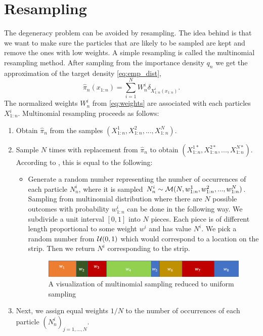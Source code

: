 \documentclass[10pt]{article}
\theoremstyle{definition}
\numberwithin{equation}{section}
\begin{document}
\section{Resampling}
The degeneracy problem can be avoided by resampling. The idea behind is that we want to make sure the particles that are likely to be sampled are kept and remove the ones with low weights. A simple resampling is called the multinomial resampling method. After sampling from the importance density $q_n$ we get the approximation of the target density \eqref{eq:emp_dist}, $$\hat{\pi}_n(x_{1:n}) = \sum_{i=1}^{N} W^i_n \delta_{X^i_{1:n}(x_{1:n})}.$$ The normalized weights $W_n^i$ from \eqref{eq:weights} are associated with each particles $X^i_{1:n}$. Multinomial resampling \cite{gordon1993novel} proceeds as follows:
\begin{enumerate}
	\item Obtain $\hat{\pi}_n$ from the samples $(X^1_{1:n}, X^2_{1:n}, ..., X^N_{1:n} )$.
	\item Sample $N$ times with replacement from $\hat{\pi}_n$ to obtain $(X^{1*}_{1:n}, X^{2*}_{1:n}, ..., X^{N*}_{1:n} ).$ According to \cite{doucet2008}, this is equal to the following:
	\begin{itemize}	
		\item Generate a random number representing the number of occurrences of each particle $N^i_n$, where it is sampled $N^i_n \sim \mathcal{M}(N,w^1_{1:n},w^2_{1:n}, ..., w^N_{1:n})$. Sampling from multinomial distribution where there are $N$ possible outcomes with probability $w^i_{1:n}$ can be done in the following way. We subdivide a unit interval $[0,1]$ into $N$ pieces. Each piece is of different length proportional to some weight $w^i$ and has value $N^i$. We pick a random number from $\mathcal{U}(0,1)$ which would correspond to a location on the strip. Then we return $N^i$ corresponding to the strip.
		\begin{figure}[htp]
			\centering
			\includegraphics[scale=0.4]{tape.png}
			\caption{A visualization of multinomial sampling reduced to uniform sampling}
		\end{figure}
		
	\end{itemize}
	\item Next, we assign equal weights $1/N$ to the number of occurrences of each particle $(N^{i}_{n})_{j=1,...,N}$.
\end{enumerate}
\end{document}
